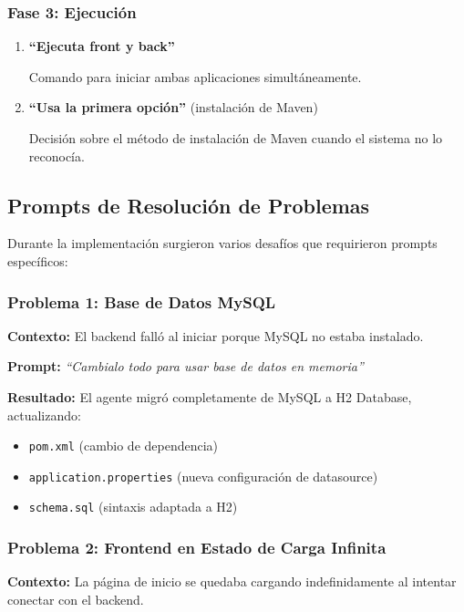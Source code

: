 \documentclass[11pt,a4paper]{article}
\begin{document}
\subsubsection{Fase 3: Ejecución}

\begin{enumerate}
    \item \textbf{``Ejecuta front y back''}
    
    Comando para iniciar ambas aplicaciones simultáneamente.
    
    \item \textbf{``Usa la primera opción''} (instalación de Maven)
    
    Decisión sobre el método de instalación de Maven cuando el sistema no lo reconocía.
\end{enumerate}

\subsection{Prompts de Resolución de Problemas}

Durante la implementación surgieron varios desafíos que requirieron prompts específicos:

\subsubsection{Problema 1: Base de Datos MySQL}

\textbf{Contexto:} El backend falló al iniciar porque MySQL no estaba instalado.

\textbf{Prompt:} \textit{``Cambialo todo para usar base de datos en memoria''}

\textbf{Resultado:} El agente migró completamente de MySQL a H2 Database, actualizando:
\begin{itemize}
    \item \texttt{pom.xml} (cambio de dependencia)
    \item \texttt{application.properties} (nueva configuración de datasource)
    \item \texttt{schema.sql} (sintaxis adaptada a H2)
\end{itemize}

\subsubsection{Problema 2: Frontend en Estado de Carga Infinita}

\textbf{Contexto:} La página de inicio se quedaba cargando indefinidamente al intentar conectar con el backend.
\end{document}
